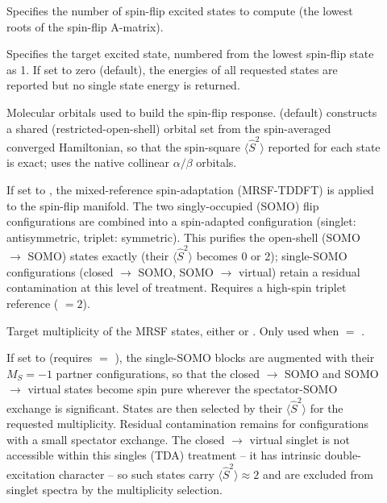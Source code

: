 \begin{description}

\item[] Specifies the number of spin-flip excited states
  to compute (the lowest roots of the spin-flip A-matrix).

\item[] Specifies the target excited state, numbered from
  the lowest spin-flip state as 1. If set to zero (default), the energies of
  all requested states are reported but no single state energy is returned.

\item[] Molecular orbitals used to build the spin-flip response.
   (default) constructs a shared (restricted-open-shell) orbital set
  from the spin-averaged converged Hamiltonian, so that the spin-square
  $\langle \hat S^2\rangle$ reported for each state is exact;
   uses the native collinear $\alpha/\beta$ orbitals.

\item[] If set to , the mixed-reference
  spin-adaptation (MRSF-TDDFT) is applied to the spin-flip manifold. The two
  singly-occupied (SOMO) flip configurations are combined into a spin-adapted
  configuration (singlet: antisymmetric, triplet: symmetric). This purifies the
  open-shell (SOMO $\to$ SOMO) states exactly (their $\langle \hat S^2\rangle$
  becomes 0 or 2); single-SOMO configurations (closed $\to$ SOMO,
  SOMO $\to$ virtual) retain a residual contamination at this level of
  treatment. Requires a high-spin triplet reference
  ( $= 2$).

\item[] Target multiplicity of the MRSF states, either
   or . Only used when  $=$
  .

\item[] If set to  (requires  $=$
  ), the single-SOMO blocks are augmented with their $M_S=-1$ partner
  configurations, so that the closed $\to$ SOMO and SOMO $\to$ virtual states
  become spin pure wherever the spectator-SOMO exchange is significant. States
  are then selected by their $\langle \hat S^2\rangle$ for the requested
  multiplicity. Residual contamination remains for configurations with a small
  spectator exchange. The closed $\to$ virtual singlet is not accessible within
  this singles (TDA) treatment -- it has intrinsic double-excitation character --
  so such states carry $\langle \hat S^2\rangle \approx 2$ and are excluded from
  singlet spectra by the multiplicity selection.

\end{description}

